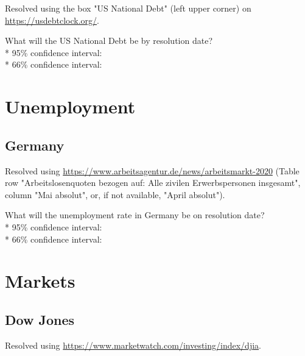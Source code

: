 \documentclass{article}
\begin{document}
Resolved using the box "US National Debt" (left upper corner) on
\href{https://usdebtclock.org/}{https://usdebtclock.org/}.

\vspace{0.3cm}

What will the US National Debt be by resolution date?\\*
95\% confidence interval: \null\hfill\underline{\hspace{8cm}}\\*
66\% confidence interval: \null\hfill\underline{\hspace{8cm}}

\section*{Unemployment}

\subsection*{Germany}

Resolved using
\href{https://www.arbeitsagentur.de/news/arbeitsmarkt-2020}{https://www.arbeitsagentur.de/news/arbeitsmarkt-2020}
(Table row "Arbeitslosenquoten bezogen auf: Alle zivilen Erwerbspersonen
insgesamt", column "Mai absolut", or, if not available, "April absolut").

\vspace{0.2cm}

What will the unemployment rate in Germany be on resolution date?\\*
95\% confidence interval: \null\hfill\underline{\hspace{8cm}}\\*
66\% confidence interval: \null\hfill\underline{\hspace{8cm}}

\section*{Markets}

\subsection*{Dow Jones}

Resolved using
\href{https://www.marketwatch.com/investing/index/djia}{https://www.marketwatch.com/investing/index/djia}.

\vspace{0.3cm}
\end{document}
